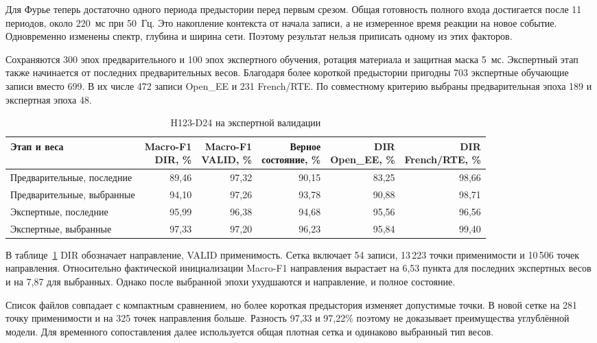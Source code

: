 Для Фурье теперь достаточно одного периода предыстории
перед первым срезом. Общая готовность полного входа
достигается после 11 периодов, около 220~мс при 50~Гц.
Это накопление контекста от начала записи,
а не измеренное время реакции на новое событие.
Одновременно изменены спектр, глубина и ширина сети.
Поэтому результат нельзя приписать одному из этих факторов.

Сохраняются 300 эпох предварительного и 100 эпох
экспертного обучения, ротация материала и защитная маска 5~мс.
Экспертный этап также начинается от последних предварительных весов.
Благодаря более короткой предыстории пригодны 703
экспертные обучающие записи вместо 699.
В их числе 472 записи Open\_EE и 231 French/RTE.
По совместному критерию выбраны предварительная эпоха 189
и экспертная эпоха 48.

\begin{table}[htbp]
\centering\small
\caption{H123-D24 на экспертной валидации}
\label{tab:ch5_h123_expert}
\setlength{\tabcolsep}{3pt}
\begin{tabular}{p{}rrrrr}
\toprule
Этап и веса & \shortstack{Macro-F1\\DIR, \%}
 & \shortstack{Macro-F1\\VALID, \%}
 & \shortstack{Верное\\состояние, \%}
 & \shortstack{DIR\\Open\_EE, \%}
 & \shortstack{DIR\\French/RTE, \%} \\
\midrule
Предварительные, последние & 89,46 & 97,32 & 90,15 & 83,25 & 98,66 \\
Предварительные, выбранные & 94,10 & 97,26 & 93,78 & 90,88 & 98,71 \\
Экспертные, последние & 95,99 & 96,38 & 94,68 & 95,56 & 96,56 \\
Экспертные, выбранные & 97,33 & 97,20 & 96,23 & 95,84 & 99,40 \\
\bottomrule
\end{tabular}
\end{table}

В таблице~\ref{tab:ch5_h123_expert} DIR обозначает направление,
VALID применимость. Сетка включает 54 записи,
13\,223 точки применимости и 10\,506 точек направления.
Относительно фактической инициализации Macro-F1 направления
вырастает на 6,53 пункта для последних экспертных весов
и на 7,87 для выбранных.
Однако после выбранной эпохи ухудшаются
и направление, и полное состояние.

Список файлов совпадает с компактным сравнением,
но более короткая предыстория изменяет допустимые точки.
В новой сетке на 281 точку применимости
и на 325 точек направления больше.
Разность 97,33 и 97,22\% поэтому
не доказывает преимущества углублённой модели.
Для временного сопоставления далее используется
общая плотная сетка и одинаково выбранный тип весов.

